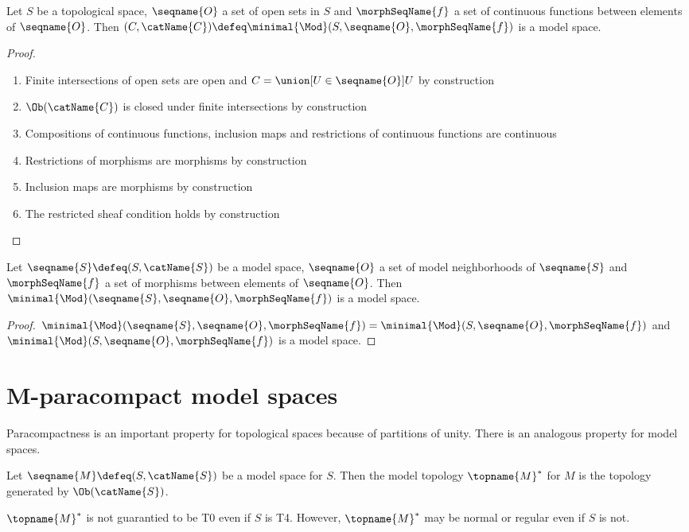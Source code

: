 \documentclass{article}
\begin{document}
\begin{lemma}
\label{lem:minmod}
Let $S$ be a topological space, $\seqname{O}$ a set of open sets in $S$
and $\morphSeqName{f}$ a set of continuous functions between elements of
$\seqname{O}$. Then
$(C,\catName{C}) \defeq \minimal{\Mod}(S, \seqname{O}, \morphSeqName{f})$
is a model space.

\begin{proof}
\leavevmode
\begin{enumerate}
\item Finite intersections of open sets are open and
$C = \union[U \in \seqname{O}]{U}$ by construction
\item $\Ob(\catName{C})$ is closed under finite intersections by
construction
\item Compositions of continuous functions, inclusion maps and
restrictions of continuous functions are continuous
\item Restrictions of morphisms are morphisms by construction
\item Inclusion maps are morphisms by construction
\item The restricted sheaf condition holds by construction
\end{enumerate}
\end{proof}

Let $\seqname{S} \defeq (S, \catName{S})$ be a model space,
$\seqname{O}$ a set of model neighborhoods of $\seqname{S}$ and
$\morphSeqName{f}$ a set of morphisms between elements of $\seqname{O}$.
Then
$\minimal{\Mod}(\seqname{S}, \seqname{O}, \morphSeqName{f})$
is a model space.

\begin{proof}
$
  \minimal{\Mod}(\seqname{S}, \seqname{O}, \morphSeqName{f}) =
  \minimal{\Mod}(S, \seqname{O}, \morphSeqName{f})
$
and $\minimal{\Mod}(S, \seqname{O}, \morphSeqName{f})$ is a model space.
\end{proof}
\end{lemma}

\section{M-paracompact model spaces}
\label{sec:m-para}
Paracompactness is an important property for topological spaces because
of partitions of unity. There is an analogous property for model
spaces.

\begin{definition}
\label{def:ModTop}
Let $\seqname{M} \defeq (S, \catName{S})$ be a model space for $S$.
Then the model topology $\topname{M}^*$ for $M$ is the topology
generated by $\Ob(\catName{S})$.
\begin{remark}
$\topname{M}^*$ is not guarantied to be T0 even if $S$ is T4. However,
$\topname{M}^*$ may be normal or regular even if $S$ is not.
\end{remark}
\end{definition}
\end{document}
